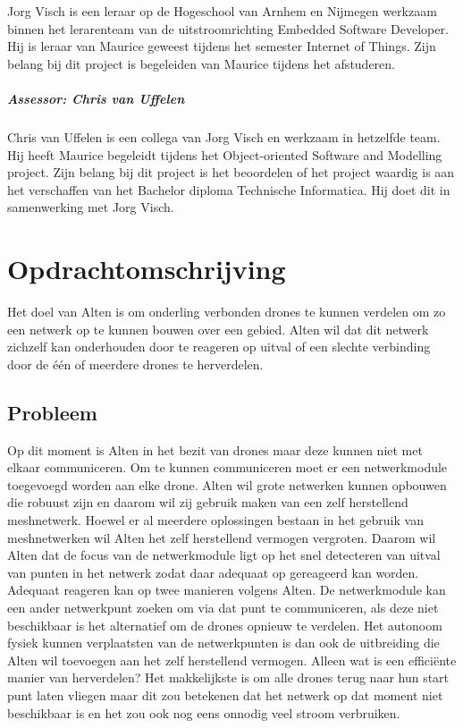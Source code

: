 \documentclass[a4paper, 11pt, oneside]{report}
\begin{document}
Jorg Visch is een leraar op de Hogeschool van Arnhem en Nijmegen werkzaam binnen het lerarenteam van de uitstroomrichting Embedded Software Developer. Hij is leraar van Maurice geweest tijdens het semester Internet of Things. Zijn belang bij dit project is begeleiden van Maurice tijdens het afstuderen.

\paragraph{Assessor: Chris van Uffelen}

Chris van Uffelen is een collega van Jorg Visch en werkzaam in hetzelfde team. Hij heeft Maurice begeleidt tijdens het Object-oriented Software and Modelling project. Zijn belang bij dit project is het beoordelen of het project waardig is aan het verschaffen van het Bachelor diploma Technische Informatica. Hij doet dit in samenwerking met Jorg Visch. 


\chapter{Opdrachtomschrijving}\label{sec:opdrachtomschrijving}
Het doel van Alten is om onderling verbonden drones te kunnen verdelen om zo een netwerk op te kunnen bouwen over een gebied. 
Alten wil dat dit netwerk zichzelf kan onderhouden door te reageren op uitval of een slechte verbinding door de één of meerdere drones te herverdelen.

\section{Probleem}\label{sec:probleem}
Op dit moment is Alten in het bezit van drones maar deze kunnen niet met elkaar communiceren.
Om te kunnen communiceren moet er een netwerkmodule toegevoegd worden aan elke drone.
Alten wil grote netwerken kunnen opbouwen die robuust zijn en daarom wil zij gebruik maken van een zelf herstellend meshnetwerk.
Hoewel er al meerdere oplossingen bestaan in het gebruik van meshnetwerken wil Alten het zelf herstellend vermogen vergroten. 
Daarom wil Alten dat de focus van de netwerkmodule ligt op het snel detecteren van uitval van punten in het netwerk zodat daar adequaat op gereageerd kan worden.
Adequaat reageren kan op twee manieren volgens Alten.
De netwerkmodule kan een ander netwerkpunt zoeken om via dat punt te communiceren, als deze niet beschikbaar is het alternatief om de drones opnieuw te verdelen.
Het autonoom fysiek kunnen verplaatsten van de netwerkpunten is dan ook de uitbreiding die Alten wil toevoegen aan het zelf herstellend vermogen.
Alleen wat is een efficiënte manier van herverdelen?
Het makkelijkste is om alle drones terug naar hun start punt laten vliegen maar dit zou betekenen dat het netwerk op dat moment niet beschikbaar is en het zou ook nog eens onnodig veel stroom verbruiken.
\end{document}
